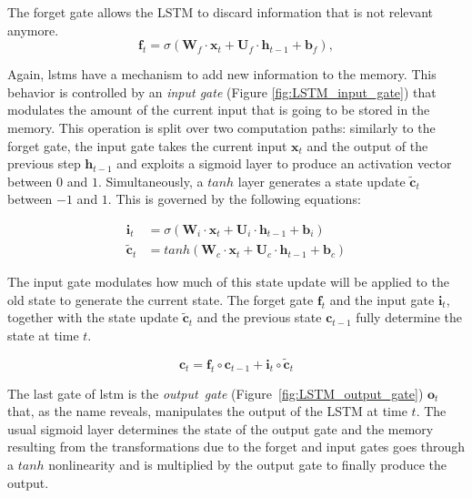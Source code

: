 The forget gate allows the LSTM to discard information that is not relevant anymore. 
\begin{equation}\label{eq:LSTM_forget_gate}
\mathbf{f}_t = \sigma\left(\mathbf{W}_f \cdot \mathbf{x}_t + \mathbf{U}_f \cdot \mathbf{h}_{t-1} + \mathbf{b}_f \right),
\end{equation}

Again, \gls{lstm}s have a mechanism to add new information to the memory. This behavior is controlled by an \emph{input gate} (Figure \ref{fig:LSTM_input_gate}) that modulates the amount of the current input that is going to be stored in the memory. This operation is split over two computation paths: similarly to the forget gate, the input gate takes the current input $\mathbf{x}_t$ and the output of the previous step $\mathbf{h}_{t-1}$ and exploits a sigmoid layer to produce an activation vector between $0$ and $1$. Simultaneously, a $tanh$ layer generates a state update $\mathbf{\tilde c}_t$ between $-1$ and $1$. This is governed by the following equations:

\begin{equation}\label{eq:LSTM_input_gate}
\begin{split}
\mathbf{i}_t &= \sigma\left(\mathbf{W}_i \cdot \mathbf{x}_t + \mathbf{U}_i \cdot \mathbf{h}_{t-1} + \mathbf{b}_i \right)\\
\mathbf{\tilde c}_t &= tanh \left(\mathbf{W}_c \cdot \mathbf{x}_t + \mathbf{U}_c \cdot \mathbf{h}_{t-1} + \mathbf{b}_c \right)
\end{split}
\end{equation}

The input gate modulates how much of this state update will be applied to the old state to generate the current state. The forget gate $\mathbf{f}_t$ and the input gate $\mathbf{i}_t$, together with the state update $\mathbf{\tilde c}_t$ and the previous state $\mathbf{c}_{t-1}$ fully determine the state at time $t$. 

\begin{equation}\label{eq:LSTM_state_update}
\mathbf{c}_t = \mathbf{f}_t \circ \mathbf{c}_{t-1} + \mathbf{i}_t \circ \mathbf{\tilde c}_t
\end{equation}

The last gate of \gls{lstm} is the \emph{output~gate} (Figure~\ref{fig:LSTM_output_gate}) $\mathbf{o}_t$ that, as the name reveals, manipulates the output of the LSTM at time $t$. The usual sigmoid layer determines the state of the output gate and the memory resulting from the transformations due to the forget and input gates goes through a $tanh$ nonlinearity and is multiplied by the output gate to finally produce the output.

